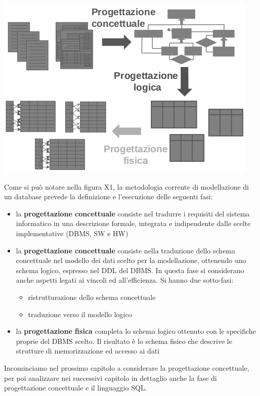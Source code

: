 \documentclass[a4paper,12pt, oneside]{book}
\begin{document}
\begin{center}
\includegraphics[scale=2.5]{img/bas4.png}
\end{center}
Come si può notare nella figura X1, la metodologia corrente di modellazione di un database
prevede la definizione e l'esecuzione delle seguenti fasi:
\begin{itemize}
    \item la \textbf{progettazione concettuale} consiste nel tradurre i requisiti del sistema informatico
            in una descrizione formale, integrata e indipendente dalle scelte implementative (DBMS, SW e HW)
    \item la \textbf{progettazione concettuale} consiste nella traduzione dello schema concettuale nel modello dei dati
            scelto per la modellazione, ottenendo uno schema logico, espresso nel DDL del DBMS.\newline
          In questa fase si considerano anche aspetti legati ai vincoli ed all'efficienza. Si hanno due sotto-fasi:
          \begin{itemize}
                \item ristrutturazione dello schema concettuale
                \item traduzione verso il modello logico
          \end{itemize}
    \item la \textbf{progettazione fisica} completa lo schema logico ottenuto con le specifiche proprie del DBMS scelto.
          Il risultato è lo schema fisico che descrive le strutture di memorizzazione ed accesso ai dati
\end{itemize}
Incominciamo nel prossimo capitolo a considerare la progettazione concettuale, per poi analizzare nei successivi capitolo
in dettaglio anche la fase di progettazione concettuale e il linguaggio SQL.
\end{document}
